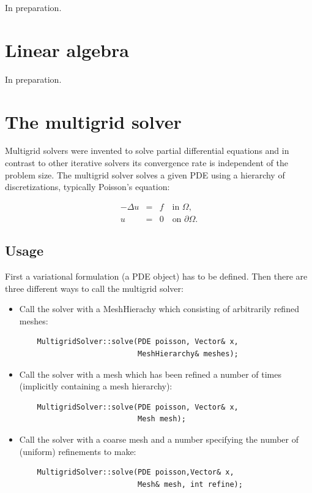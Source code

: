 \documentclass[12pt]{article}
\begin{document}
In preparation.

\cleardoublepage
\section{Linear algebra}

In preparation.

\cleardoublepage
\section{The multigrid solver}

Multigrid solvers were invented to solve partial differential
equations and in contrast to other iterative solvers its convergence
rate is independent of the problem size. The multigrid solver solves a
given PDE using a hierarchy of discretizations, typically Poisson's equation:

\begin{equation}
  \begin{array}{rcl}
    -\Delta u &=& f \quad \mbox{in } \Omega,\\
    u &=& 0 \quad \mbox{on }  \partial\Omega.
  \end{array}
\end{equation} 

\subsection{Usage}
First a variational formulation (a PDE object) has to be defined. Then there are three different ways to call the multigrid solver:
\begin{itemize}
\item Call the solver with a MeshHierachy which consisting of arbitrarily refined meshes:
  
  \begin{verbatim}
    MultigridSolver::solve(PDE poisson, Vector& x,
                           MeshHierarchy& meshes);
  \end{verbatim}
  
\item Call the solver with a mesh which has been refined a number of times (implicitly containing a mesh hierarchy):
  
  \begin{verbatim}
    MultigridSolver::solve(PDE poisson, Vector& x,
                           Mesh mesh);
  \end{verbatim}

\item Call the solver with a coarse mesh and a number specifying the number of (uniform) refinements to make:
  
  \begin{verbatim}
    MultigridSolver::solve(PDE poisson,Vector& x, 
                           Mesh& mesh, int refine);
  \end{verbatim}
\end{itemize}
\end{document}
